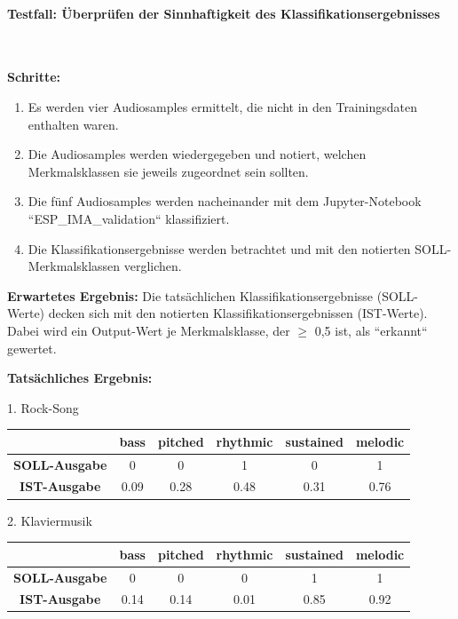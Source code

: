 \paragraph{Testfall: Überprüfen der Sinnhaftigkeit des Klassifikationsergebnisses}\mbox{}\\
\begin{adjustwidth}{0.5cm}{0cm}
\textbf{Schritte:}
\begin{enumerate}
	\item Es werden vier Audiosamples ermittelt, die nicht in den Trainingsdaten enthalten waren.
	\item Die Audiosamples werden wiedergegeben und notiert, welchen Merkmalsklassen sie jeweils zugeordnet sein sollten.
	\item Die fünf Audiosamples werden nacheinander mit dem Jupyter-Notebook ``ESP\_IMA\_validation`` klassifiziert.
	\item Die Klassifikationsergebnisse werden betrachtet und mit den notierten SOLL-Merkmalsklassen verglichen.
\end{enumerate}

\textbf{Erwartetes Ergebnis:} Die tatsächlichen Klassifikationsergebnisse (SOLL-Werte) decken sich mit den notierten Klassifikationsergebnissen (IST-Werte). Dabei wird ein Output-Wert je Merkmalsklasse, der $\geq$ 0,5 ist, als ``erkannt`` gewertet.

\newpage

\textbf{Tatsächliches Ergebnis:}

1. Rock-Song

\begin{table}[h!]
\centering
\begin{tabular}{|c|c|c|c|c|c|}
    \hline
     & \textbf{bass} & \textbf{pitched} & \textbf{rhythmic} & \textbf{sustained} & \textbf{melodic} \\ \hline
    \textbf{SOLL-Ausgabe} & 0 & 0 & 1 & 0 & 1 \\ \hline
    \textbf{IST-Ausgabe} & 0.09 & 0.28 & 0.48 & 0.31 & 0.76 \\ \hline
\end{tabular}
\end{table}


2. Klaviermusik

\begin{table}[h!]
\centering
\begin{tabular}{|c|c|c|c|c|c|}
    \hline
     & \textbf{bass} & \textbf{pitched} & \textbf{rhythmic} & \textbf{sustained} & \textbf{melodic} \\ \hline
    \textbf{SOLL-Ausgabe} & 0 & 0 & 0 & 1 & 1 \\ \hline
    \textbf{IST-Ausgabe} & 0.14 & 0.14 & 0.01 & 0.85 & 0.92 \\ \hline
\end{tabular}
\end{table}


\end{adjustwidth}
